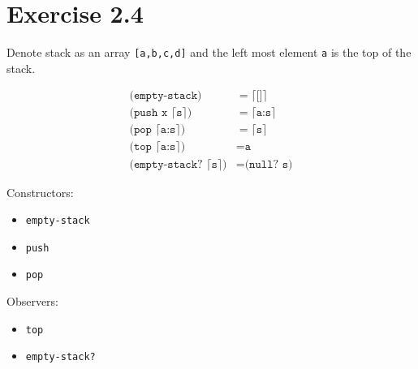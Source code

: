 \section*{Exercise 2.4}

Denote stack as an array \texttt{[a,b,c,d]} and the left most element \texttt{a}
is the top of the stack.

\begin{align*}
    \texttt{(empty-stack)} &= \lceil \texttt{[]}\rceil \\
    \texttt{(push x }\lceil \texttt{s} \rceil \texttt{)}
        &= \lceil \texttt{a:s} \rceil \\
    \texttt{(pop } \lceil \texttt{a:s} \rceil \texttt{)}
        &= \lceil \texttt{s} \rceil \\
    \texttt{(top } \lceil \texttt{a:s} \rceil \texttt{)}
        &= \texttt{a} \\
    \texttt{(empty-stack? } \lceil \texttt{s} \rceil \texttt{)}
        &= \texttt{(null? s)}
\end{align*}

Constructors:

\begin{itemize}
    \item\texttt{empty-stack}
    \item\texttt{push}
    \item\texttt{pop}
\end{itemize}

Observers:

\begin{itemize}
    \item\texttt{top}
    \item\texttt{empty-stack?}
\end{itemize}
